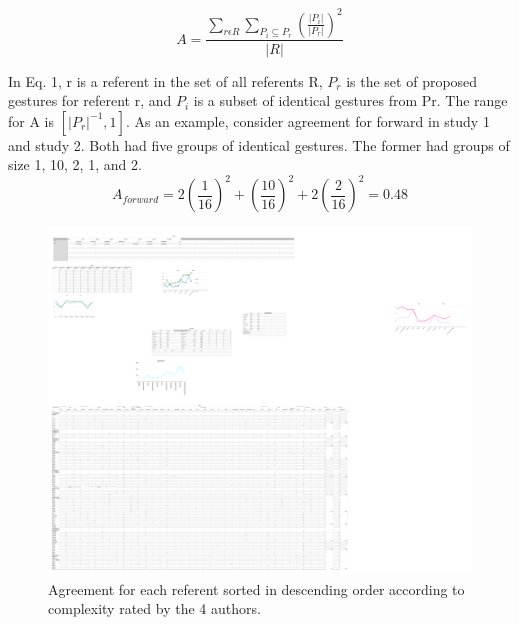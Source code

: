 \documentclass{sigchi}
\begin{document}
\begin{equation}
A = \frac{\displaystyle{\sum_{r\epsilon R }} \sum_{P_i \subseteq P_r } \left(\frac{\lvert{P_i}\rvert}{\lvert{P_r}\rvert}\right) ^ 2}{\displaystyle{\lvert{R}\rvert}}
\end{equation}

In Eq. 1, r is a referent in the set of all referents R, $P_{r}$ is the set of proposed gestures for referent r, and $P_{i}$ is a subset of identical gestures from Pr. The range for A is $\left[\lvert{P_r}\rvert ^{-1}, 1\right]$. As an example, consider agreement for forward in study 1 and study 2. Both had five groups of identical gestures. The former had groups of size 1, 10, 2, 1, and 2.
\begin{equation}
   A_{forward} = 2\left(\frac{1}{16}\right) ^ 2  + \left(\frac{10}{16}\right) ^ 2 + 2\left(\frac{2}{16}\right) ^ 2 = 0.48
\end{equation}



\begin{figure}[!h]
\centering
\includegraphics[width=1\columnwidth]{agreement.pdf}
\caption{Agreement for each referent sorted in descending order according to complexity rated by the 4 authors.}
\label{fig:agreementFigure}
\end{figure}
\end{document}

